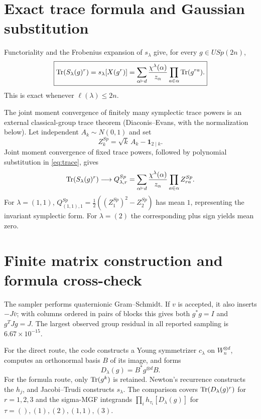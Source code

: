 \documentclass[11pt]{article}
\begin{document}
\section{Exact trace formula and Gaussian substitution}
Functoriality and the Frobenius expansion of $s_\lambda$ give, for every $g\in USp(2n)$,
\begin{equation}\label{eq:trace}
 \boxed{\operatorname{Tr}(S_\lambda(g)^r)=s_\lambda[X(g^r)]
 =\sum_{\alpha\vdash d}\frac{\chi^\lambda(\alpha)}{z_\alpha}
 \prod_{a\in\alpha}\operatorname{Tr}(g^{ra}).}
\end{equation}
This is exact whenever $\ell(\lambda)\le2n$.

The joint moment convergence of finitely many symplectic trace powers is an
external classical-group trace theorem (Diaconis--Evans, with the
normalization below).  Let independent $A_k\sim N(0,1)$ and set
\begin{equation}
 Z_k^{Sp}=\sqrt{k}\,A_k-\mathbf1_{2\mid k}.
\end{equation}
Joint moment convergence of fixed trace powers, followed by polynomial substitution in \eqref{eq:trace}, gives
\begin{equation}
 \operatorname{Tr}(S_\lambda(g)^r)\longrightarrow Q^{Sp}_{\lambda,r}
 =\sum_{\alpha\vdash d}\frac{\chi^\lambda(\alpha)}{z_\alpha}\prod_{a\in\alpha}Z_{ra}^{Sp}.
\end{equation}
For $\lambda=(1,1)$,
$Q^{Sp}_{(1,1),1}=\tfrac12((Z_1^{Sp})^2-Z_2^{Sp})$ has mean $1$, representing the invariant symplectic form. For $\lambda=(2)$ the corresponding plus sign yields mean zero.

\section{Finite matrix construction and formula cross-check}
The sampler performs quaternionic Gram--Schmidt. If $v$ is accepted, it also inserts $-J\bar v$; with columns ordered in pairs of blocks this gives both $g^*g=I$ and $g^TJg=J$. The largest observed group residual in all reported sampling is $6.67\times10^{-15}$.

For the direct route, the code constructs a Young symmetrizer $c_\lambda$ on $W_n^{\otimes d}$, computes an orthonormal basis $B$ of its image, and forms
\begin{equation}
 D_\lambda(g)=B^*g^{\otimes d}B.
\end{equation}
For the formula route, only $\operatorname{Tr}(g^k)$ is retained. Newton's recurrence constructs the $h_j$, and Jacobi--Trudi constructs $s_\lambda$. The comparison covers $\operatorname{Tr}(D_\lambda(g)^r)$ for $r=1,2,3$ and the sigma-MGF integrands $\prod_i h_{\tau_i}[D_\lambda(g)]$ for $\tau=(),(1),(2),(1,1),(3)$.
\end{document}
